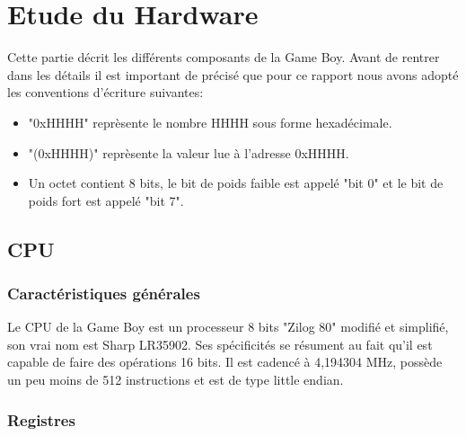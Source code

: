 \documentclass[french]{report}
\begin{document}
\chapter{Etude du Hardware}
Cette partie décrit les différents composants de la Game Boy. Avant de rentrer dans les détails il est important de précisé que pour ce rapport nous avons adopté les conventions d'écriture suivantes:
\begin{itemize}
\item{"0xHHHH" reprèsente le nombre HHHH sous forme hexadécimale.}
\item{"(0xHHHH)" reprèsente la valeur lue à l'adresse 0xHHHH.}
\item{Un octet contient 8 bits, le bit de poids faible est appelé "bit 0" et le bit de poids fort est appelé "bit 7".}
\end{itemize}
\section{CPU}
\subsection{Caractéristiques générales}
Le \gls{CPU} de la Game Boy est un processeur 8 bits "Zilog 80" modifié et simplifié, son vrai nom est Sharp LR35902.
Ses spécificités se résument au fait qu'il est capable de faire des opérations 16 bits.
Il est cadencé à 4,194304 MHz, possède un peu moins de 512 instructions et est de type little endian.
\subsection{Registres}
\end{document}
